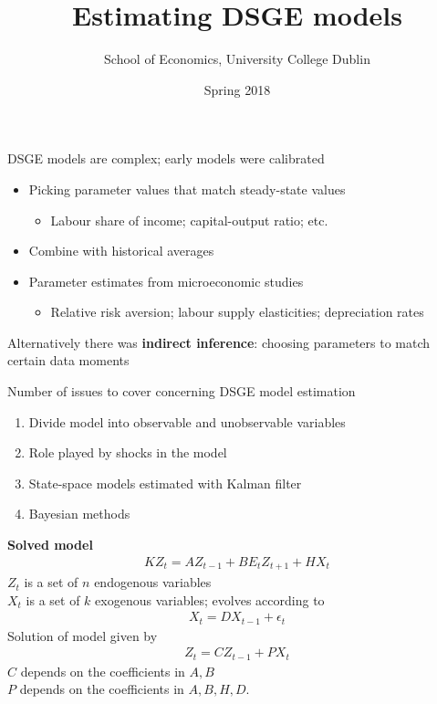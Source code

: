 \documentclass{beamer}
\title{Estimating DSGE models}
\author{School of Economics, University College Dublin}
\date{Spring 2018}
\begin{document}
\begin{frame}
 \titlepage
\end{frame}

\begin{frame}
 DSGE models are complex; early models were calibrated
 \begin{itemize}
     \item Picking parameter values that match steady-state values
     \begin{itemize}
       \item Labour share of income; capital-output ratio; etc. 
     \end{itemize}
     \item Combine with historical averages
     \item Parameter estimates from microeconomic studies 
     \begin{itemize}
       \item Relative risk aversion; labour supply elasticities; depreciation rates
     \end{itemize}
   \end{itemize}  
   \medskip
   Alternatively there was \textbf{indirect inference}: choosing parameters to match certain data moments
\end{frame}

\begin{frame}
  Number of issues to cover concerning DSGE model estimation\medskip  
\begin{enumerate}
  \item Divide model into observable and unobservable variables
  \item Role played by shocks in the model
  \item State-space models estimated with Kalman filter
  \item Bayesian methods
\end{enumerate}
\end{frame}

\begin{frame}
  \textbf{Solved model}  
\begin{align}  
  KZ_t = AZ_{t-1} + BE_tZ_{t+1} + HX_t 
\end{align}
$Z_t$ is a set of $n$ endogenous variables\\
$X_t$ is a set of $k$ exogenous variables; evolves according to 
\begin{align}
  X_t=DX_{t-1}+\epsilon_t
\end{align}
\medskip
Solution of model given by
\begin{align}  
  Z_t=CZ_{t-1}+PX_t 
\end{align}
$C$ depends on the coefficients in $A,B$\\
$P$ depends on the coefficients in $A,B,H,D$.
\end{frame}
\end{document}
